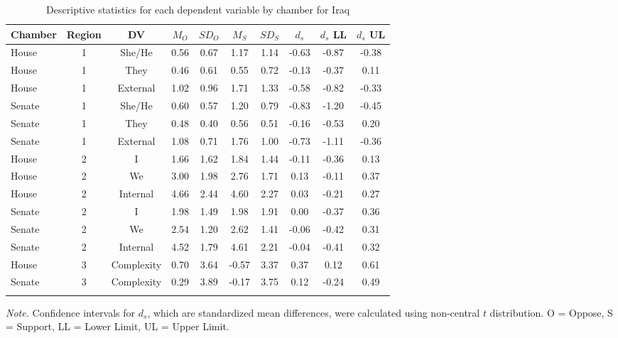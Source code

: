 \documentclass[english,,man]{apa6}
\begin{document}
\begin{table}[tbp]

\begin{center}
\begin{threeparttable}

\caption{\label{tab:Itable}Descriptive statistics for each dependent variable by chamber for Iraq}

\small{

\begin{tabular}{lccccccccc}
\toprule
Chamber & Region & DV & $M_O$ & $SD_O$ & $M_S$ & $SD_S$ & $d_s$ & $d_s$ LL & $d_s$ UL\\
\midrule
House & 1 & She/He & 0.56 & 0.67 & 1.17 & 1.14 & -0.63 & -0.87 & -0.38\\
House & 1 & They & 0.46 & 0.61 & 0.55 & 0.72 & -0.13 & -0.37 & 0.11\\
House & 1 & External & 1.02 & 0.96 & 1.71 & 1.33 & -0.58 & -0.82 & -0.33\\
Senate & 1 & She/He & 0.60 & 0.57 & 1.20 & 0.79 & -0.83 & -1.20 & -0.45\\
Senate & 1 & They & 0.48 & 0.40 & 0.56 & 0.51 & -0.16 & -0.53 & 0.20\\
Senate & 1 & External & 1.08 & 0.71 & 1.76 & 1.00 & -0.73 & -1.11 & -0.36\\
House & 2 & I & 1.66 & 1.62 & 1.84 & 1.44 & -0.11 & -0.36 & 0.13\\
House & 2 & We & 3.00 & 1.98 & 2.76 & 1.71 & 0.13 & -0.11 & 0.37\\
House & 2 & Internal & 4.66 & 2.44 & 4.60 & 2.27 & 0.03 & -0.21 & 0.27\\
Senate & 2 & I & 1.98 & 1.49 & 1.98 & 1.91 & 0.00 & -0.37 & 0.36\\
Senate & 2 & We & 2.54 & 1.20 & 2.62 & 1.41 & -0.06 & -0.42 & 0.31\\
Senate & 2 & Internal & 4.52 & 1.79 & 4.61 & 2.21 & -0.04 & -0.41 & 0.32\\
House & 3 & Complexity & 0.70 & 3.64 & -0.57 & 3.37 & 0.37 & 0.12 & 0.61\\
Senate & 3 & Complexity & 0.29 & 3.89 & -0.17 & 3.75 & 0.12 & -0.24 & 0.49\\
\bottomrule
\addlinespace
\end{tabular}

}

\begin{tablenotes}[para]
\normalsize{\textit{Note.} Confidence intervals for $d_s$, which are standardized mean differences, were calculated using 
          non-central $t$ distribution. O = Oppose, S = Support, LL = Lower Limit, UL = Upper Limit.}
\end{tablenotes}

\end{threeparttable}
\end{center}

\end{table}
\end{document}
